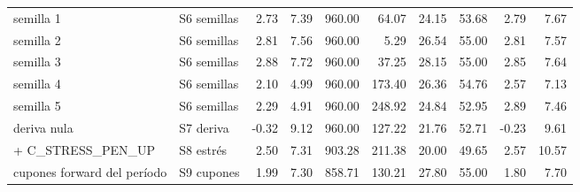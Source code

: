 \begin{table}[htbp]
{\begin{tabular}{llrrrrrrrr}
semilla 1 & S6 semillas & 2.73 & 7.39 & 960.00 & 64.07 & 24.15 & 53.68 & 2.79 & 7.67 \\
semilla 2 & S6 semillas & 2.81 & 7.56 & 960.00 & 5.29 & 26.54 & 55.00 & 2.81 & 7.57 \\
semilla 3 & S6 semillas & 2.88 & 7.72 & 960.00 & 37.25 & 28.15 & 55.00 & 2.85 & 7.64 \\
semilla 4 & S6 semillas & 2.10 & 4.99 & 960.00 & 173.40 & 26.36 & 54.76 & 2.57 & 7.13 \\
semilla 5 & S6 semillas & 2.29 & 4.91 & 960.00 & 248.92 & 24.84 & 52.95 & 2.89 & 7.46 \\
deriva nula & S7 deriva & -0.32 & 9.12 & 960.00 & 127.22 & 21.76 & 52.71 & -0.23 & 9.61 \\
+ C\_STRESS\_PEN\_UP & S8 estrés & 2.50 & 7.31 & 903.28 & 211.38 & 20.00 & 49.65 & 2.57 & 10.57 \\
cupones forward del período & S9 cupones & 1.99 & 7.30 & 858.71 & 130.21 & 27.80 & 55.00 & 1.80 & 7.70 \\
\bottomrule
\end{tabular}}
\end{table}
